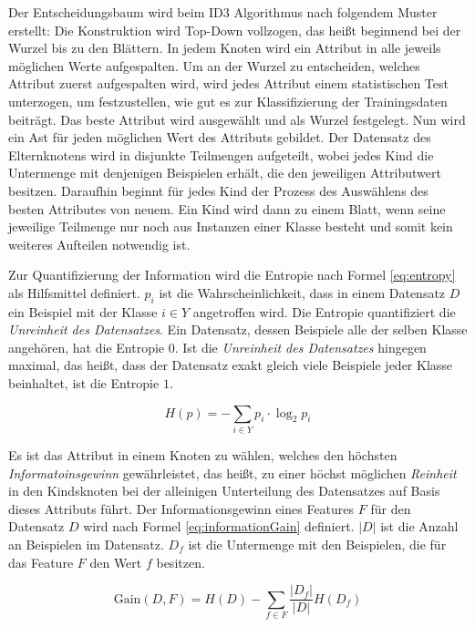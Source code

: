 Der Entscheidungsbaum wird beim ID3 Algorithmus nach folgendem Muster erstellt: Die Konstruktion wird Top-Down vollzogen, das heißt beginnend bei der Wurzel bis zu den Blättern. In jedem Knoten wird ein Attribut in alle jeweils möglichen Werte aufgespalten. Um an der Wurzel zu entscheiden, welches Attribut zuerst aufgespalten wird, wird jedes Attribut einem statistischen Test unterzogen, um festzustellen, wie \glqq gut\grqq{} es zur Klassifizierung der Trainingsdaten beiträgt. Das \glqq beste\grqq{} Attribut wird ausgewählt und als Wurzel festgelegt. Nun wird ein Ast für jeden möglichen Wert des Attributs gebildet. Der Datensatz des Elternknotens wird in disjunkte Teilmengen aufgeteilt, wobei jedes Kind die Untermenge mit denjenigen Beispielen erhält, die den jeweiligen Attributwert besitzen. Daraufhin beginnt für jedes Kind der Prozess des Auswählens des \glqq besten\grqq{} Attributes von neuem. Ein Kind wird dann zu einem Blatt, wenn seine jeweilige Teilmenge nur noch aus Instanzen einer Klasse besteht und somit kein weiteres Aufteilen notwendig ist.\cite[S. 55]{machine_mitchell}

Zur Quantifizierung der Information wird die Entropie nach Formel \ref{eq:entropy} als Hilfsmittel definiert. $p_i$ ist die Wahrscheinlichkeit, dass in einem Datensatz $D$ ein Beispiel mit der Klasse $i \in Y$ angetroffen wird. Die Entropie quantifiziert die \emph{Unreinheit des Datensatzes}. Ein Datensatz, dessen Beispiele alle der selben Klasse angehören, hat die Entropie $0$. Ist die \emph{Unreinheit des Datensatzes} hingegen maximal, das heißt, dass der Datensatz exakt gleich viele Beispiele jeder Klasse beinhaltet, ist die Entropie $1$. \cite[S. 135]{machine_marsland}

\begin{equation}
H(p) = -\sum_{i \in Y} p_i \cdot \log_{2} p_i
\label{eq:entropy}
\end{equation}

Es ist das Attribut in einem Knoten zu wählen, welches den höchsten \emph{Informatoinsgewinn} gewährleistet, das heißt, zu einer höchst möglichen \emph{Reinheit} in den Kindsknoten bei der alleinigen Unterteilung des Datensatzes auf Basis dieses Attributs führt. Der Informationsgewinn eines Features $F$ für den Datensatz $D$ wird nach Formel \ref{eq:informationGain} definiert. $|D|$ ist die Anzahl an Beispielen im Datensatz. $D_f$ ist die Untermenge mit den Beispielen, die für das Feature $F$ den Wert $f$ besitzen.\cite[S. 136 - 137]{machine_marsland}

\begin{equation}
\text{Gain}(D,F) = H(D) - \sum_{f \in F} \frac{|D_f|}{|D|} H(D_f)
\label{eq:informationGain}
\end{equation}

